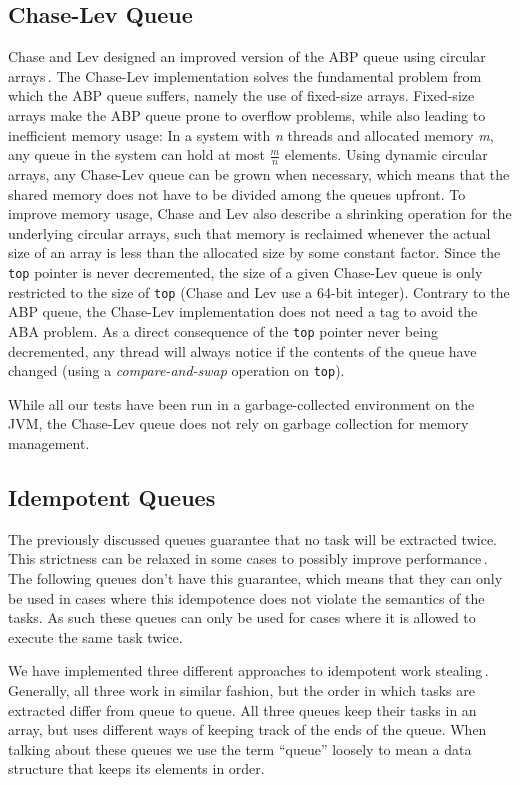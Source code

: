 \subsection{Chase-Lev Queue}
Chase and Lev designed an improved version of the ABP queue using circular arrays\,\citep{ChaseLev05}. The Chase-Lev implementation solves the fundamental problem from which the ABP queue suffers, namely the use of fixed-size arrays. Fixed-size arrays make the ABP queue prone to overflow problems, while also leading to inefficient memory usage: In a system with \emph{n} threads and allocated memory \emph{m}, any queue in the system can hold at most $\frac{m}{n}$ elements. Using dynamic circular arrays, any Chase-Lev queue can be grown when necessary, which means that the shared memory does not have to be divided among the queues upfront. To improve memory usage, Chase and Lev also describe a shrinking operation for the underlying circular arrays, such that memory is reclaimed whenever the actual size of an array is less than the allocated size by some constant factor. Since the \texttt{top} pointer is never decremented, the size of a given Chase-Lev queue is only restricted to the size of \texttt{top} (Chase and Lev use a 64-bit integer). Contrary to the ABP queue, the Chase-Lev implementation does not need a tag to avoid the ABA problem. As a direct consequence of the \texttt{top} pointer never being decremented, any thread will always notice if the contents of the queue have changed (using a \emph{compare-and-swap} operation on \texttt{top}).

While all our tests have been run in a garbage-collected environment on the JVM, the Chase-Lev queue does not rely on garbage collection for memory management.

\subsection{Idempotent Queues}
The previously discussed queues guarantee that no task will be extracted twice. This strictness can be relaxed in some cases to possibly improve performance\,\cite[p. 46]{Michael:2009:IWS:1594835.1504186}. The following queues don't have this guarantee, which means that they can only be used in cases where this idempotence does not violate the semantics of the tasks. As such these queues can only be used for cases where it is allowed to execute the same task twice.

We have implemented three different approaches to idempotent work stealing\,\cite{Michael:2009:IWS:1594835.1504186}. Generally, all three work in similar fashion, but the order in which tasks are extracted differ from queue to queue. All three queues keep their tasks in an array, but uses different ways of keeping track of the ends of the queue. When talking about these queues we use the term ``queue'' loosely to mean a data structure that keeps its elements in order.

